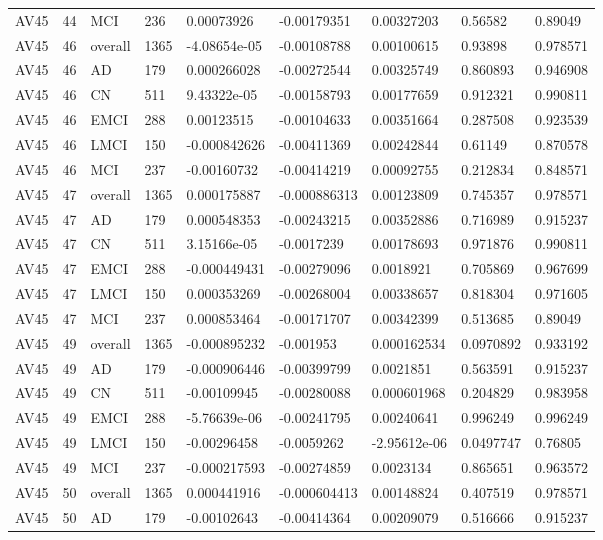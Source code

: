 \begin{landscape}
\begin{longtable}{lllllllll}
AV45 & 44 & MCI & 236 & 0.00073926 & -0.00179351 & 0.00327203 & 0.56582 & 0.89049 \\
AV45 & 46 & overall & 1365 & -4.08654e-05 & -0.00108788 & 0.00100615 & 0.93898 & 0.978571 \\
AV45 & 46 & AD & 179 & 0.000266028 & -0.00272544 & 0.00325749 & 0.860893 & 0.946908 \\
AV45 & 46 & CN & 511 & 9.43322e-05 & -0.00158793 & 0.00177659 & 0.912321 & 0.990811 \\
AV45 & 46 & EMCI & 288 & 0.00123515 & -0.00104633 & 0.00351664 & 0.287508 & 0.923539 \\
AV45 & 46 & LMCI & 150 & -0.000842626 & -0.00411369 & 0.00242844 & 0.61149 & 0.870578 \\
AV45 & 46 & MCI & 237 & -0.00160732 & -0.00414219 & 0.00092755 & 0.212834 & 0.848571 \\
AV45 & 47 & overall & 1365 & 0.000175887 & -0.000886313 & 0.00123809 & 0.745357 & 0.978571 \\
AV45 & 47 & AD & 179 & 0.000548353 & -0.00243215 & 0.00352886 & 0.716989 & 0.915237 \\
AV45 & 47 & CN & 511 & 3.15166e-05 & -0.0017239 & 0.00178693 & 0.971876 & 0.990811 \\
AV45 & 47 & EMCI & 288 & -0.000449431 & -0.00279096 & 0.0018921 & 0.705869 & 0.967699 \\
AV45 & 47 & LMCI & 150 & 0.000353269 & -0.00268004 & 0.00338657 & 0.818304 & 0.971605 \\
AV45 & 47 & MCI & 237 & 0.000853464 & -0.00171707 & 0.00342399 & 0.513685 & 0.89049 \\
AV45 & 49 & overall & 1365 & -0.000895232 & -0.001953 & 0.000162534 & 0.0970892 & 0.933192 \\
AV45 & 49 & AD & 179 & -0.000906446 & -0.00399799 & 0.0021851 & 0.563591 & 0.915237 \\
AV45 & 49 & CN & 511 & -0.00109945 & -0.00280088 & 0.000601968 & 0.204829 & 0.983958 \\
AV45 & 49 & EMCI & 288 & -5.76639e-06 & -0.00241795 & 0.00240641 & 0.996249 & 0.996249 \\
AV45 & 49 & LMCI & 150 & -0.00296458 & -0.0059262 & -2.95612e-06 & 0.0497747 & 0.76805 \\
AV45 & 49 & MCI & 237 & -0.000217593 & -0.00274859 & 0.0023134 & 0.865651 & 0.963572 \\
AV45 & 50 & overall & 1365 & 0.000441916 & -0.000604413 & 0.00148824 & 0.407519 & 0.978571 \\
AV45 & 50 & AD & 179 & -0.00102643 & -0.00414364 & 0.00209079 & 0.516666 & 0.915237 \\

\end{longtable}
\end{landscape}
